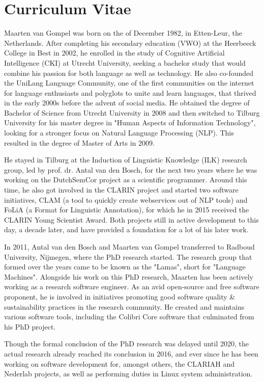 \chapter*{Curriculum Vitae}

Maarten van Gompel was born on the  of December 1982, in Etten-Leur,
the Netherlands. After completing his secondary education (VWO) at the
Heerbeeck College in Best in 2002, he enrolled in the study of
Cognitive Artificial Intelligence (CKI) at Utrecht University,
seeking a bachelor study that would combine his
passion for both language as well as technology. He also
co-founded the UniLang Language Community, one of the first communities on the
internet for language enthusiasts and polyglots to unite and learn languages,
that thrived in the early 2000s before the advent of social media. He obtained
the degree of Bachelor of Science from Utrecht University in 2008 and then
switched to Tilburg University for his master degree in "Human Aspects of
Information Technology", looking for a stronger focus on Natural Language
Processing (NLP).  This resulted in the degree of Master of Arts in 2009.

He stayed in Tilburg at the Induction of Linguistic Knowledge (ILK) research
group, led by prof. dr. Antal van den Bosch, for the next two years where he was working on
the DutchSemCor project as a scientific programmer. Around this time, he also
got involved in the CLARIN project and started two software
initiatives, CLAM (a tool to quickly create webservices out of NLP tools) and
FoLiA (a Format for Linguistic Annotation), for which he in 2015 received the CLARIN Young Scientist Award. Both projects
still in active development to this day, a decade later, and have provided a foundation for a lot of his later work.

In 2011, Antal van den Bosch and Maarten van Gompel transferred to Radboud
University, Nijmegen, where the PhD research started. The research group that
formed over the years came to be known as the "Lamas", short for "Language
Machines".  Alongside his work on this PhD research, Maarten has been actively
working as a research software engineer. As an avid open-source and free
software proponent, he is involved in initiatives promoting good software
quality \& sustainability practices in the research community. He created and
maintains various software tools, including the Colibri Core software that
culminated from his PhD project.

Though the formal conclusion of the PhD research was delayed until 2020, the
actual research already reached its conclusion in 2016, and ever since he has
been working on software development for, amongst others, the CLARIAH and
Nederlab projects, as well as performing duties in Linux system administration.
